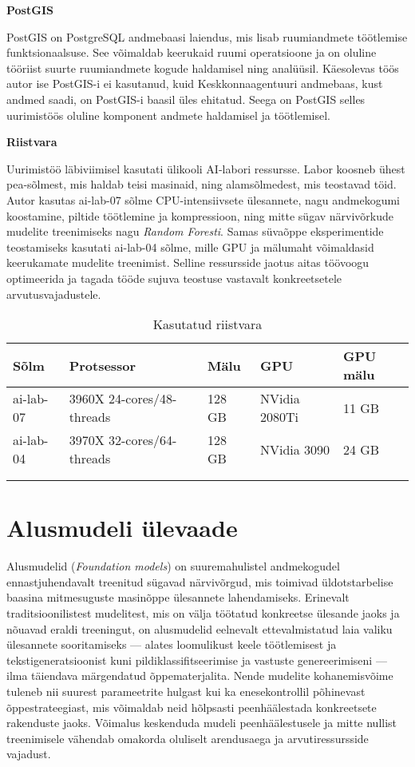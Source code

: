 \textbf{PostGIS}\nopagebreak[4]

PostGIS on PostgreSQL andmebaasi laiendus, mis lisab ruumiandmete töötlemise funktsionaalsuse. See võimaldab keerukaid ruumi operatsioone
ja on oluline tööriist suurte ruumiandmete kogude haldamisel ning
analüüsil. Käesolevas töös autor ise PostGIS-i ei kasutanud, kuid Keskkonnaagentuuri andmebaas, kust andmed saadi, on PostGIS-i baasil üles ehitatud. Seega on PostGIS selles uurimistöös oluline komponent andmete haldamisel ja töötlemisel.

\textbf{Riistvara}\nopagebreak[4]

Uurimistöö läbiviimisel kasutati ülikooli AI-labori ressursse. Labor koosneb ühest pea-sõlmest, mis haldab teisi masinaid, ning alamsõlmedest, mis teostavad töid. Autor kasutas ai-lab-07 sõlme CPU-intensiivsete ülesannete, nagu andmekogumi koostamine, piltide töötlemine ja kompressioon, ning mitte sügav närvivõrkude mudelite treenimiseks nagu \textit{Random Foresti}. Samas süvaõppe eksperimentide teostamiseks kasutati ai-lab-04 sõlme, mille GPU ja mälumaht võimaldasid keerukamate mudelite treenimist. Selline ressursside jaotus aitas töövoogu optimeerida ja tagada tööde sujuva teostuse vastavalt konkreetsetele arvutusvajadustele.
\begin{longtable}{lllll}
    \hline
    Sõlm & Protsessor & Mälu & GPU & GPU mälu                         \\ 
    \hline
    ai-lab-07 & 3960X 24-cores/48-threads & 128 GB & NVidia 2080Ti & 11 GB    \\
    ai-lab-04 & 3970X 32-cores/64-threads & 128 GB & NVidia 3090 & 24 GB      \\
    &              &                    &                              \\ \hline
    \caption{Kasutatud riistvara}
    \label{tab:hardwareused}
\end{longtable}



\section{Alusmudeli ülevaade}
Alusmudelid (\textit{Foundation models}) on suuremahulistel andmekogudel
ennastjuhendavalt treenitud sügavad närvivõrgud, mis toimivad üldotstarbelise
baasina mitmesuguste masinõppe ülesannete lahendamiseks. Erinevalt
traditsioonilistest mudelitest, mis on välja töötatud konkreetse ülesande jaoks
ja nõuavad eraldi treeningut, on alusmudelid eelnevalt ettevalmistatud laia
valiku ülesannete sooritamiseks --- alates loomulikust keele töötlemisest ja
tekstigeneratsioonist kuni pildiklassifitseerimise ja vastuste genereerimiseni
--- ilma täiendava märgendatud õppematerjalita. Nende mudelite
kohanemisvõime tuleneb nii suurest parameetrite hulgast kui ka enesekontrollil
põhinevast õppestrateegiast, mis võimaldab neid hõlpsasti peenhäälestada
konkreetsete rakenduste jaoks. Võimalus keskenduda mudeli peenhäälestusele ja mitte nullist treenimisele vähendab omakorda oluliselt arendusaega ja arvutiressursside vajadust.
\cite{WhatAreFoundation}


